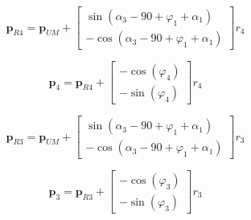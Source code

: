 \documentclass[10pt,a4paper]{article}
\begin{document}
\begin{multicols}{2}
\begin{equation}
\bm{p}_{R4} = \bm{p}_{UM} + \begin{bmatrix} 
\sin(\alpha_3 - 90 + \varphi_1 + \alpha_1) \\
- \cos(\alpha_3 - 90 + \varphi_1 + \alpha_1) \end{bmatrix} r_4
\end{equation}

\begin{equation}
\bm{p}_{4} = \bm{p}_{R4} + \begin{bmatrix} 
-\cos(\varphi_4) \\
-\sin(\varphi_4)\end{bmatrix} r_4
\end{equation}

\begin{equation}
\bm{p}_{R3} = \bm{p}_{UM} + \begin{bmatrix} 
\sin(\alpha_3 - 90 + \varphi_1 + \alpha_1) \\
 - \cos(\alpha_3 - 90 + \varphi_1 + \alpha_1) \end{bmatrix} r_3
\end{equation}

\begin{equation}
\bm{p}_{3} = \bm{p}_{R3} + \begin{bmatrix} 
- \cos(\varphi_3)\\
- \sin(\varphi_3)\end{bmatrix}r_3
\label{eq:F1_end}
\end{equation}

\end{multicols}
\end{document}

